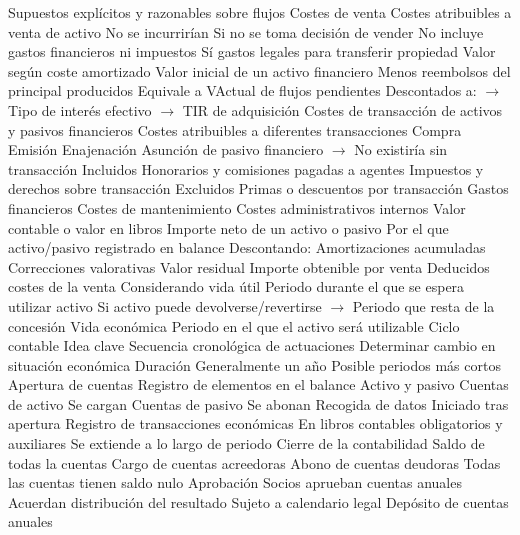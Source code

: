 \documentclass{nuevotema}
\begin{document}
\begin{esquemal}
				\4 Supuestos explícitos y razonables sobre flujos
			\3 Costes de venta
				\4 Costes atribuibles a venta de activo
				\4 No se incurrirían
				\4[] Si no se toma decisión de vender
				\4 No incluye gastos financieros ni impuestos
				\4 Sí gastos legales para transferir propiedad
			\3 Valor según coste amortizado
				\4 Valor inicial de un activo financiero
				\4[--] Menos reembolsos del principal producidos
				\4 Equivale a VActual de flujos pendientes
				\4[] Descontados a:
				\4[] $\to$ Tipo de interés efectivo
				\4[] $\to$ TIR de adquisición
			\3 Costes de transacción de activos y pasivos financieros
				\4 Costes atribuibles a diferentes transacciones
				\4[] Compra
				\4[] Emisión
				\4[] Enajenación
				\4[] Asunción de pasivo financiero
				\4[] $\to$ No existiría sin transacción
				\4 Incluidos
				\4[] Honorarios y comisiones pagadas a agentes
				\4[] Impuestos y derechos sobre transacción
				\4 Excluidos
				\4[] Primas o descuentos por transacción
				\4[] Gastos financieros
				\4[] Costes de mantenimiento
				\4[] Costes administrativos internos
			\3 Valor contable o valor en libros
				\4 Importe neto de un activo o pasivo
				\4[] Por el que activo/pasivo registrado en balance
				\4 Descontando:
				\4[] Amortizaciones acumuladas
				\4[] Correcciones valorativas
			\3 Valor residual
				\4 Importe obtenible por venta
				\4 Deducidos costes de la venta
				\4 Considerando vida útil
				\4[] Periodo durante el que se espera utilizar activo
				\4[] Si activo puede devolverse/revertirse
				\4[] $\to$ Periodo que resta de la concesión
				\4 Vida económica
				\4[] Periodo en el que el activo será utilizable
		\2 Ciclo contable
			\3 Idea clave
				\4 Secuencia cronológica de actuaciones
				\4 Determinar cambio en situación económica
			\3 Duración
				\4 Generalmente un año
				\4 Posible periodos más cortos
			\3 Apertura de cuentas
				\4 Registro de elementos en el balance
				\4[] Activo y pasivo
				\4 Cuentas de activo
				\4[] Se cargan
				\4 Cuentas de pasivo
				\4[] Se abonan
			\3 Recogida de datos
				\4 Iniciado tras apertura
				\4 Registro de transacciones económicas
				\4[] En libros contables obligatorios y auxiliares
				\4 Se extiende a lo largo de periodo
			\3 Cierre de la contabilidad
				\4 Saldo de todas la cuentas
				\4[] Cargo de cuentas acreedoras
				\4[] Abono de cuentas deudoras
				\4 Todas las cuentas tienen saldo nulo
			\3 Aprobación
				\4 Socios aprueban cuentas anuales
				\4 Acuerdan distribución del resultado
				\4 Sujeto a calendario legal
			\3 Depósito de cuentas anuales

\end{esquemal}
\end{document}
